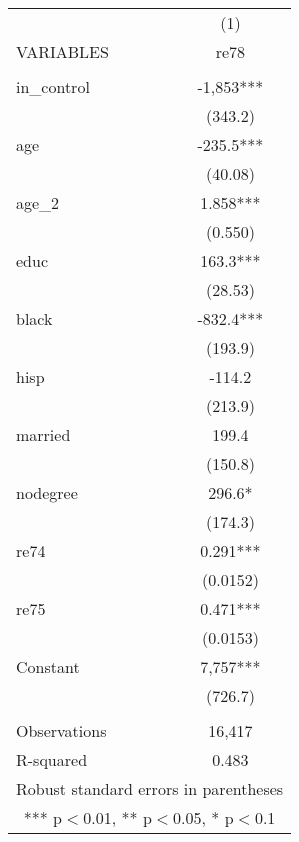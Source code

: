 \begin{tabular}{lc} \hline
 & (1) \\
VARIABLES & re78 \\ \hline
 &  \\
in\_control & -1,853*** \\
 & (343.2) \\
age & -235.5*** \\
 & (40.08) \\
age\_2 & 1.858*** \\
 & (0.550) \\
educ & 163.3*** \\
 & (28.53) \\
black & -832.4*** \\
 & (193.9) \\
hisp & -114.2 \\
 & (213.9) \\
married & 199.4 \\
 & (150.8) \\
nodegree & 296.6* \\
 & (174.3) \\
re74 & 0.291*** \\
 & (0.0152) \\
re75 & 0.471*** \\
 & (0.0153) \\
Constant & 7,757*** \\
 & (726.7) \\
 &  \\
Observations & 16,417 \\
 R-squared & 0.483 \\ \hline
\multicolumn{2}{c}{ Robust standard errors in parentheses} \\
\multicolumn{2}{c}{ *** p$<$0.01, ** p$<$0.05, * p$<$0.1} \\
\end{tabular}
